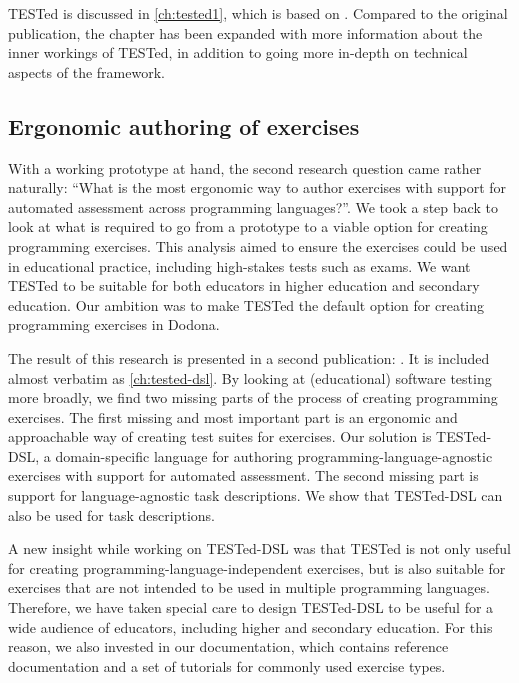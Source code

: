 \documentclass[../main]{subfiles}
\begin{document}
TESTed is discussed in \cref{ch:tested1}, which is based on \textcite{strijbolTESTedEducationalTesting2023}.
Compared to the original publication, the chapter has been expanded with more information about the inner workings of TESTed, in addition to going more in-depth on technical aspects of the framework.

\subsection{Ergonomic authoring of exercises}\label{subsec:ergonomic-testing}

With a working prototype at hand, the second research question  came rather naturally: ``What is the most ergonomic way to author exercises with support for automated assessment across programming languages?''.
We took a step back to look at what is required to go from a prototype to a viable option for creating programming exercises.
This analysis aimed to ensure the exercises could be used in educational practice, including high-stakes tests such as exams.
We want TESTed to be suitable for both educators in higher education and secondary education.
Our ambition was to make TESTed the default option for creating programming exercises in Dodona.

The result of this research is presented in a second publication: \textcite{strijbolTESTedDSLDomainspecificLanguage2024}.
It is included almost verbatim as \cref{ch:tested-dsl}.
By looking at (educational) software testing more broadly, we find two missing parts of the process of creating programming exercises.
The first missing and most important part is an ergonomic and approachable way of creating test suites for exercises.
Our solution is TESTed-DSL, a domain-specific language for authoring programming-language-agnostic exercises with support for automated assessment.
The second missing part is support for language-agnostic task descriptions.
We show that TESTed-DSL can also be used for task descriptions.

A new insight while working on TESTed-DSL was that TESTed is not only useful for creating programming-language-independent exercises, but is also suitable for exercises that are not intended to be used in multiple programming languages.
Therefore, we have taken special care to design TESTed-DSL to be useful for a wide audience of educators, including higher and secondary education.
For this reason, we also invested in our documentation, which contains reference documentation and a set of tutorials for commonly used exercise types.
\end{document}
